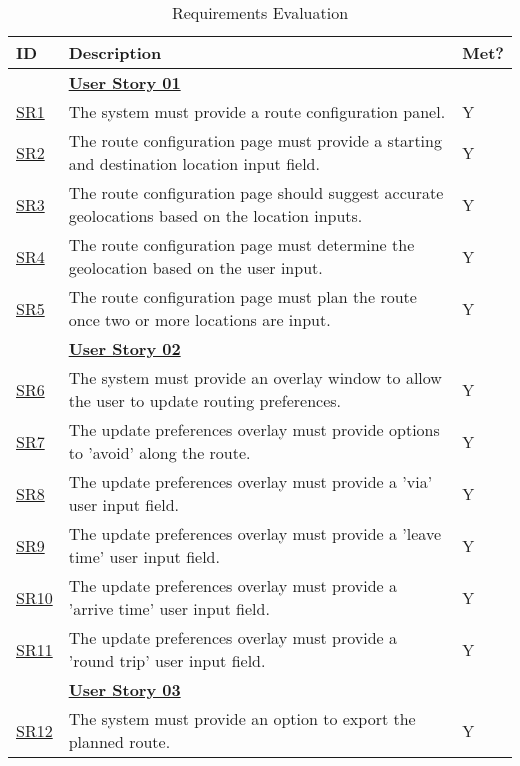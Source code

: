 \begingroup
\setlength{\tabcolsep}{10pt} %
\renewcommand{\arraystretch}{1.5} %
\begin{table}[!htb]
\caption{Requirements Evaluation}
\label{evaluatedrq}
\small
    \begin{tabularx}{\textwidth}{ p{1cm} p{11cm} p{1cm} }
        \hline
        ID & Description & Met? \\ 
        \hline
        & \textbf{\hyperref[tab:user-story-01]{User Story 01}} \\
        \hyperref[SR:1]{SR1} & The system must provide a route configuration panel. & Y\\
        \hyperref[SR:2]{SR2} & The route configuration page must provide a starting and destination location input field. & Y\\
        \hyperref[SR:3]{SR3} & The route configuration page should suggest accurate geolocations based on the location inputs.  & Y\\
        \hyperref[SR:4]{SR4} & The route configuration page must determine the geolocation based on the user input. & Y\\
        \hyperref[SR:5]{SR5} & The route configuration page must plan the route once two or more locations are input. & Y\\
        \hline
        & \textbf{\hyperref[tab:user-story-02]{User Story 02}}  \\
        \hyperref[SR:6]{SR6} & The system must provide an overlay window to allow the user to update routing preferences. & Y\\
        \hyperref[SR:7]{SR7} & The update preferences overlay must provide options to 'avoid' along the route. & Y\\
        \hyperref[SR:8]{SR8} & The update preferences overlay must provide a 'via' user input field. & Y\\ 
        \hyperref[SR:9]{SR9} & The update preferences overlay must provide a 'leave time' user input field. & Y\\ 
        \hyperref[SR:10]{SR10} & The update preferences overlay must provide a 'arrive time' user input field. & Y\\ 
        \hyperref[SR:11]{SR11} & The update preferences overlay must provide a 'round trip' user input field. & Y\\ 
        \hline
        & \textbf{\hyperref[tab:user-story-03]{User Story 03}}  \\
        \hyperref[SR:12]{SR12} & The system must provide an option to export the planned route. & Y \\

\end{tabularx}
\end{table}

